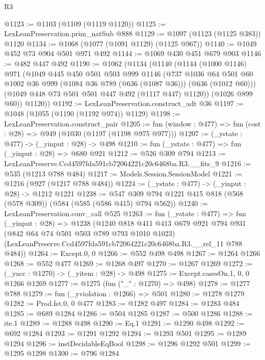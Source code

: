 \begin{lexlean}{R3}
\begin{coremodule}
@1123 := @1103 (@1109 (@1119 @1120))
@1125 := LexLeanPreservation.prim_natSub @888
@1129 := @1097 (@1123 (@1125 @383)) @1120
@1134 := @1068 (@1077 (@1091 @1129) (@1125 @967))
@1140 := @1049 @452 @73 @904 @501 @971 @492
@1144 := @1069 @430 @451 @679 @903
@1146 := @482 @447 @492
@1190 := @1062
    (@1134
      (@1140
        (@1144
          (@1000 @1146)
          @971
          (@1049
            @445
            @450
            @501
            @503
            @999
            @1146
            (@737
              @1036
              @64
              @501
              @60
              @1002
              @36
              @999
              (@1084 @36 @789 (@636 (@1087 @36)))
              (@636 (@1012 @60)))
            (@1049 @448 @73 @501 @501 @447 @492 (@1117 @447) @1120))
          (@1026 @899 @60))
        @1120))
@1192 := LexLeanPreservation.construct_adt @36
@1197 := @1048 (@1055 (@1190 (@1192 @974)) @1129)
@1198 := LexLeanPreservation.construct_pair
@1205 := fun (window : @477) => fun (cost : @28) => @949 (@1030 (@1197 (@1198 @975 @977)))
@1207 := (_ystate : @477) -> (_yinput : @28) -> @498
@1210 := fun (_ystate : @477) => fun (_yinput : @28) => @680 @921
@1212 := @526 @309 @794
@1213 := LexLeanPreserve.Ccd4597fda591cb72064221c20c6468ba.R3.__fits_9
@1216 := @535 (@1213 @788 @484)
@1217 := Models.Session.SessionModel
@1221 := @1216 (@927 (@1217 @788 @484))
@1224 := (_ystate : @477) -> (_yinput : @28) -> @1212 @1221
@1238 := @547 @309 @794 @1221 @415 @818 (@568 (@578 @309)) (@584 (@585 (@586 @415) @794 @562))
@1240 := LexLeanPreservation.conv_call @525
@1263 := fun (_ystate : @477) =>
  fun (_yinput : @28) =>
  @1238
    (@1240
      @818
      @411
      @413
      @679
      @921
      @794
      @931
      (@842 @64 @74 @501 @503 @789 @793 @1010 @1023)
      (LexLeanPreserve.Ccd4597fda591cb72064221c20c6468ba.R3.__rel_11 @788 @484))
@1264 := Except.{0, 0}
@1266 := @552 @498 @498
@1267 := @1264 @1266
@1268 := @552 @477
@1269 := @1268 @497
@1270 := @1267 @1269
@1272 := (_yacc : @1270) -> (_yitem : @28) -> @498
@1275 := Except.casesOn.{1, 0, 0} @1266 @1269
@1277 := @1275 (fun ("_" : @1270) => @498)
@1278 := @1277 @788
@1279 := fun (_yviolation : @1266) => @501
@1280 := @1278 @1279
@1282 := Prod.fst.{0, 0} @477
@1283 := @1282 @497
@1284 := @1283 @484
@1285 := @689 @1284
@1286 := @504 @1285
@1287 := @500 @1286
@1288 := ite.{1}
@1289 := @1288 @498
@1290 := Eq.{1}
@1291 := @1290 @498
@1292 := @692 @1284
@1293 := @1291 @1292
@1294 := @1293 @501
@1295 := @1289 @1294
@1296 := instDecidableEqBool
@1298 := @1296 @1292 @501
@1299 := @1295 @1298
@1300 := @796 @1284

\end{coremodule}
\end{lexlean}
